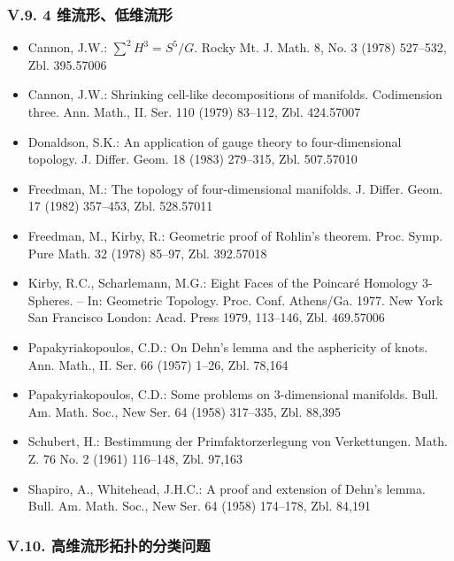 \subsubsection*{V.9. 4 维流形、低维流形}

\begin{itemize}
\item Cannon, J.W.: $\sum^2 H^3=S^5/G$. Rocky Mt. J. Math. 8, No. 3 (1978) 527--532, Zbl. 395.57006
\item Cannon, J.W.: Shrinking cell-like decompositions of manifolds. Codimension three. Ann. Math., II. Ser. 110 (1979) 83--112, Zbl. 424.57007
\item Donaldson, S.K.: An application of gauge theory to four-dimensional topology. J. Differ. Geom. 18 (1983) 279--315, Zbl. 507.57010
\item Freedman, M.: The topology of four-dimensional manifolds. J. Differ. Geom. 17 (1982) 357--453, Zbl. 528.57011
\item Freedman, M., Kirby, R.: Geometric proof of Rohlin's theorem. Proc. Symp. Pure Math. 32 (1978) 85--97, Zbl. 392.57018
\item Kirby, R.C., Scharlemann, M.G.: Eight Faces of the Poincaré Homology 3-Spheres. -- In: Geometric Topology. Proc. Conf. Athens/Ga. 1977. New York San Francisco London: Acad. Press 1979, 113--146, Zbl. 469.57006
\item Papakyriakopoulos, C.D.: On Dehn's lemma and the asphericity of knots. Ann. Math., II. Ser. 66 (1957) 1--26, Zbl. 78,164
\item Papakyriakopoulos, C.D.: Some problems on 3-dimensional manifolds. Bull. Am. Math. Soc., New Ser. 64 (1958) 317--335, Zbl. 88,395
\item Schubert, H.: Bestimmung der Primfaktorzerlegung von Verkettungen. Math. Z. 76 No. 2 (1961) 116--148, Zbl. 97,163
\item Shapiro, A., Whitehead, J.H.C.: A proof and extension of Dehn's lemma. Bull. Am. Math. Soc., New Ser. 64 (1958) 174--178, Zbl. 84,191
\end{itemize}

\subsubsection*{V.10. 高维流形拓扑的分类问题}

